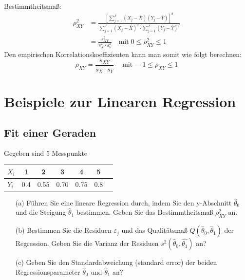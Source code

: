 Bestimmtheitsmaß:
\begin{align}
\rho_{XY}^2 &= \frac{\left[ {\sum\limits_{j = 1}^J {(X_j - \bar {X})(Y_j - \bar{Y})} } \right]^2}{\sum\limits_{j = 1}^J {(X_j - \bar {X})^2}
	\cdot
	\sum\limits_{j = 1}^J {(Y_j - \bar {Y})^2} } \nonumber \\[2ex]
&= \frac{s_{XY} ^2}{s_X ^2 \cdot s_Y ^2} \quad \textrm{mit}\; 
0 \le \rho_{XY}^2 \le 1 
\end{align} 
Den empirischen Korrelationskoeffizienten kann man somit wie folgt
berechnen:
\begin{equation}
\rho_{XY} = \frac{ s_{XY} }{ s_X \cdot s_Y } \quad \mathrm{~mit~}  - 1 \le \rho_{XY} \le 1
\end{equation}
\newpage
\section{Beispiele zur Linearen Regression}
\label{Vorl2Regressionsaufg2}
\subsection{Fit einer Geraden}
Gegeben sind 5 Messpunkte
\begin{table}[htb!]
	\centering
	\begin{tabular}{l|c c c c c c}
		$X_i$ & 1 & 2 & 3 & 4 & 5 \\ \hline
		$Y_i$ & 0.4 & 0.55 & 0.70 & 0.75 & 0.8
	\end{tabular}
\end{table}
\begin{itemize}
	\item [(a)] Führen Sie eine lineare Regression durch, indem
	Sie den y-Abschnitt $\hat\theta_0$ und die Steigung $\hat\theta_1$ bestimmen. Geben Sie das Bestimmtheitsmaß $\rho_{XY}^2$ an.
	\item[(b)] Bestimmen Sie die Residuen $\varepsilon_j$ und das 
	Qualitätsmaß $Q(\hat\theta _0,\hat\theta _1)$ der Regression. Geben Sie die Varianz der Residuen 
	$s^2(\hat\theta_0,\hat{\theta_1})$ an?
	\item[(c)] Geben Sie den Standardabweichung (standard error) der beiden 
	Regressionsparameter $\hat\theta_0$ und $\hat\theta_1$ an?
	
\end{itemize}

